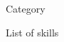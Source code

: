 \documentclass[../resume.tex]{subfiles}
\begin{document}
\skill
{Category}
{
  \item List of skills
}
\end{document}
